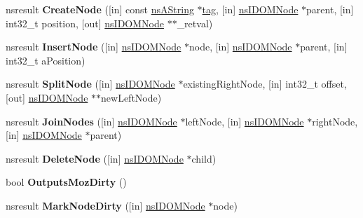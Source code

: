 \begin{DoxyCompactItemize}
nsresult {\bfseries Create\+Node} (\mbox{[}in\mbox{]} const \hyperlink{structns_string_container}{ns\+A\+String} $\ast$\hyperlink{structtag}{tag}, \mbox{[}in\mbox{]} \hyperlink{interfacens_i_d_o_m_node}{ns\+I\+D\+O\+M\+Node} $\ast$parent, \mbox{[}in\mbox{]} int32\+\_\+t position, \mbox{[}out\mbox{]} \hyperlink{interfacens_i_d_o_m_node}{ns\+I\+D\+O\+M\+Node} $\ast$$\ast$\+\_\+retval)
\item 
\mbox{\label{interfacens_i_editor_aaf0968da769772a2d14a50d6900d238d}} 
nsresult {\bfseries Insert\+Node} (\mbox{[}in\mbox{]} \hyperlink{interfacens_i_d_o_m_node}{ns\+I\+D\+O\+M\+Node} $\ast$node, \mbox{[}in\mbox{]} \hyperlink{interfacens_i_d_o_m_node}{ns\+I\+D\+O\+M\+Node} $\ast$parent, \mbox{[}in\mbox{]} int32\+\_\+t a\+Position)
\item 
\mbox{\label{interfacens_i_editor_acf0cab27f1542f58e5a52575ca2ff4b8}} 
nsresult {\bfseries Split\+Node} (\mbox{[}in\mbox{]} \hyperlink{interfacens_i_d_o_m_node}{ns\+I\+D\+O\+M\+Node} $\ast$existing\+Right\+Node, \mbox{[}in\mbox{]} int32\+\_\+t offset, \mbox{[}out\mbox{]} \hyperlink{interfacens_i_d_o_m_node}{ns\+I\+D\+O\+M\+Node} $\ast$$\ast$new\+Left\+Node)
\item 
\mbox{\label{interfacens_i_editor_a811fd84117b443a574697ceadc91c98e}} 
nsresult {\bfseries Join\+Nodes} (\mbox{[}in\mbox{]} \hyperlink{interfacens_i_d_o_m_node}{ns\+I\+D\+O\+M\+Node} $\ast$left\+Node, \mbox{[}in\mbox{]} \hyperlink{interfacens_i_d_o_m_node}{ns\+I\+D\+O\+M\+Node} $\ast$right\+Node, \mbox{[}in\mbox{]} \hyperlink{interfacens_i_d_o_m_node}{ns\+I\+D\+O\+M\+Node} $\ast$parent)
\item 
\mbox{\label{interfacens_i_editor_aae27c7ae3948f2fb156baef88da5bcf2}} 
nsresult {\bfseries Delete\+Node} (\mbox{[}in\mbox{]} \hyperlink{interfacens_i_d_o_m_node}{ns\+I\+D\+O\+M\+Node} $\ast$child)
\item 
\mbox{\label{interfacens_i_editor_afb21f7253e601845d693ec99d6d1ef55}} 
bool {\bfseries Outputs\+Moz\+Dirty} ()
\item 
\mbox{\label{interfacens_i_editor_a94fcc2df539603fc18b033003a009b13}} 
nsresult {\bfseries Mark\+Node\+Dirty} (\mbox{[}in\mbox{]} \hyperlink{interfacens_i_d_o_m_node}{ns\+I\+D\+O\+M\+Node} $\ast$node)

\end{DoxyCompactItemize}
